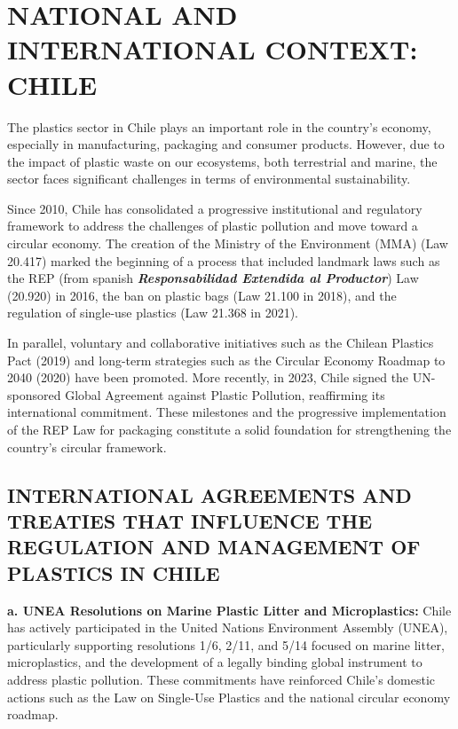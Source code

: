 \documentclass[
  12pt,
  oneside]{book}
\begin{document}
\chapter{NATIONAL AND INTERNATIONAL CONTEXT: CHILE}\label{sec-chile}

The plastics sector in Chile plays an important role in the country's
economy, especially in manufacturing, packaging and consumer products.
However, due to the impact of plastic waste on our ecosystems, both
terrestrial and marine, the sector faces significant challenges in terms
of environmental sustainability.

Since 2010, Chile has consolidated a progressive institutional and
regulatory framework to address the challenges of plastic pollution and
move toward a circular economy. The creation of the Ministry of the
Environment (MMA) (Law 20.417) marked the beginning of a process that
included landmark laws such as the REP (from spanish
\textbf{\emph{Responsabilidad Extendida al Productor}}) Law (20.920) in
2016, the ban on plastic bags (Law 21.100 in 2018), and the regulation
of single-use plastics (Law 21.368 in 2021).

In parallel, voluntary and collaborative initiatives such as the Chilean
Plastics Pact (2019) and long-term strategies such as the Circular
Economy Roadmap to 2040 (2020) have been promoted. More recently, in
2023, Chile signed the UN-sponsored Global Agreement against Plastic
Pollution, reaffirming its international commitment. These milestones
and the progressive implementation of the REP Law for packaging
constitute a solid foundation for strengthening the country's circular
framework.

\section{INTERNATIONAL AGREEMENTS AND TREATIES THAT INFLUENCE THE
REGULATION AND MANAGEMENT OF PLASTICS IN
CHILE}\label{international-agreements-and-treaties-that-influence-the-regulation-and-management-of-plastics-in-chile}

\textbf{a. UNEA Resolutions on Marine Plastic Litter and Microplastics:
}Chile has actively participated in the United Nations Environment
Assembly (UNEA), particularly supporting resolutions 1/6, 2/11, and 5/14
focused on marine litter, microplastics, and the development of a
legally binding global instrument to address plastic pollution. These
commitments have reinforced Chile's domestic actions such as the Law on
Single-Use Plastics and the national circular economy roadmap.
\end{document}
